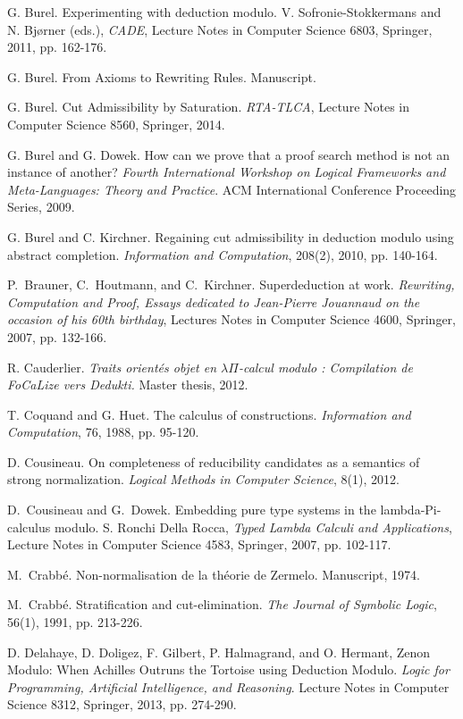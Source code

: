 \documentclass{llncs}
\begin{document}
\begin{thebibliography}{99.}
G. Burel. 
Experimenting with deduction modulo.
V. Sofronie-Stokkermans and N. Bj\o rner (eds.), 
{\em CADE}, 
Lecture Notes in Computer Science 6803, Springer, 2011, pp. 162-176. 

G. Burel. 
From Axioms to Rewriting Rules. 
Manuscript.

G. Burel. 
Cut Admissibility by Saturation.  
{\em RTA-TLCA}, Lecture Notes in Computer Science 8560, Springer, 2014.

G. Burel and G. Dowek.
How can we prove that a proof search method is not an instance of another? 
{\em Fourth International Workshop on
Logical Frameworks and Meta-Languages: Theory and Practice}.
ACM International Conference Proceeding Series, 2009.

G. Burel and C. Kirchner. 
Regaining cut admissibility in deduction modulo using abstract completion. 
{\em Information and Computation}, 208(2), 2010, pp. 140-164.

P.~Brauner, C.~Houtmann, and C.~Kirchner.
Superdeduction at work. 
{\em Rewriting, Computation and Proof, Essays dedicated to Jean-Pierre
Jouannaud on the occasion of his 60th birthday}, 
Lectures Notes in Computer Science 4600, Springer, 2007, pp. 132-166.

R. Cauderlier.
{\em Traits orientés objet en $\lambda \Pi$-calcul modulo :
Compilation de FoCaLize vers Dedukti.}
Master thesis, 2012.

T. Coquand and G. Huet.
The calculus of constructions.
{\em Information and Computation}, 76, 1988, pp. 95-120.

D. Cousineau.
On completeness of reducibility candidates as a semantics of strong 
normalization. 
{\em Logical Methods in Computer Science}, 8(1), 2012.

D.~Cousineau and G.~Dowek. 
Embedding pure type systems in the lambda-Pi-calculus modulo. 
S. Ronchi Della Rocca, {\em Typed Lambda Calculi and
Applications}, Lecture Notes in Computer Science 4583, Springer,
2007, pp. 102-117.

M.~Crabb\'e.
Non-normalisation de la th\'eorie de Zermelo.
Manuscript, 1974.

M.~Crabb\'e.
Stratification and cut-elimination.
{\em The Journal of Symbolic Logic}, 56(1), 1991, pp. 213-226.


D. Delahaye, D. Doligez, F. Gilbert, P. Halmagrand, and O. Hermant, 
Zenon Modulo: When Achilles Outruns the Tortoise using Deduction Modulo.
{\em Logic for Programming, Artificial Intelligence, and Reasoning}.
Lecture Notes in Computer Science 8312, Springer, 2013, pp. 274-290.



\end{thebibliography}
\end{document}
